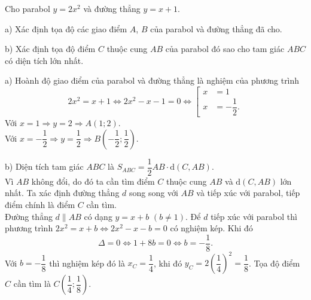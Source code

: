 	\begin{ex}%
Cho parabol $y=2x^2$ và đường thẳng $y=x+1$.
	
	\item a) Xác định tọa độ các giao điểm $A$, $B$ của parabol và đường thẳng đã cho.
	\item b) Xác định tọa độ điểm $C$ thuộc cung $AB$ của parabol đó sao cho tam giác $ABC$ có diện tích lớn nhất.  
	
\loigiai 
{	\item a)
Hoành độ giao điểm của parabol và đường thẳng là nghiệm của phương trình
	$$2x^2=x+1\Leftrightarrow 2x^2-x-1=0 \Leftrightarrow  \left[\begin{aligned} x&=1 \\ x&=-\dfrac{1}{2}. \end{aligned}\right. $$
	Với $x=1 \Rightarrow y=2\Rightarrow A(1;2).$ \\
Với $x=-\dfrac{1}{2}\Rightarrow y=\dfrac{1}{2}\Rightarrow B \left( -\dfrac{1}{2};\dfrac{1}{2}\right) .$
	
\item b)
 Diện tích tam giác $ABC$ là $S_{ABC}=\dfrac{1}{2}AB \cdot \text{d} (C,AB)$. \\
 Vì $AB$ không đổi, do đó ta cần tìm điểm $C$ thuộc cung $AB$ và $\text{d}(C,AB)$ lớn nhất. Ta xác định đường thẳng $d$ song song với $AB$ và tiếp xúc với parabol, tiếp điểm chính là điểm $C$ cần tìm. \\
Đường thẳng $d \parallel AB$ có dạng $y=x+b$ $(b\neq 1)$.
	Để $d$ tiếp xúc với parabol thì phương trình $2x^2=x+b\Leftrightarrow 2x^2-x-b=0$ có nghiệm kép. Khi đó 
	$$ \Delta= 0 \Leftrightarrow 1+8b=0\Leftrightarrow b=-\dfrac{1}{8}.$$
	Với $b=-\dfrac{1}{8}$ thì nghiệm kép đó là $x_C=\dfrac{1}{4}$, khi đó $y_C=2\left( \dfrac{1}{4}\right) ^2=\dfrac{1}{8}$. Tọa độ điểm $C$ cần tìm là $C\left( \dfrac{1}{4};\dfrac{1}{8}\right) .$
	}
\end{ex}
